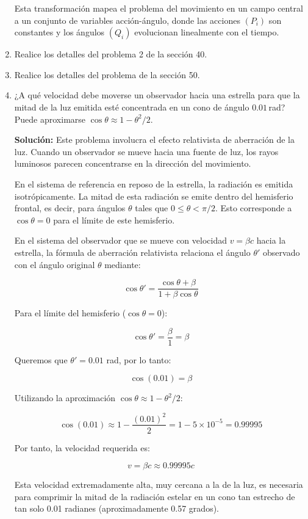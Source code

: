 \documentclass[12pt]{article}
\begin{document}
\begin{enumerate}
  Esta transformación mapea el problema del movimiento en un campo central a un conjunto de variables acción-ángulo, donde las acciones $(P_i)$ son constantes y los ángulos $(Q_i)$ evolucionan linealmente con el tiempo.

  \item Realice los detalles del problema 2 de la sección 40.
  \item Realice los detalles del problema de la sección 50.
  \item ¿A qué velocidad debe moverse un observador hacia una estrella para que la mitad de la luz emitida esté concentrada en un cono de ángulo \(0.01\)\,rad? Puede aproximarse \(\cos\theta\approx1-\theta^2/2\).
  
  \textbf{Solución:} 
  Este problema involucra el efecto relativista de aberración de la luz. Cuando un observador se mueve hacia una fuente de luz, los rayos luminosos parecen concentrarse en la dirección del movimiento.

  En el sistema de referencia en reposo de la estrella, la radiación es emitida isotrópicamente. La mitad de esta radiación se emite dentro del hemisferio frontal, es decir, para ángulos $\theta$ tales que $0 \leq \theta < \pi/2$. Esto corresponde a $\cos\theta = 0$ para el límite de este hemisferio.

  En el sistema del observador que se mueve con velocidad $v = \beta c$ hacia la estrella, la fórmula de aberración relativista relaciona el ángulo $\theta'$ observado con el ángulo original $\theta$ mediante:

  \[
  \cos\theta' = \frac{\cos\theta + \beta}{1 + \beta\cos\theta}
  \]

  Para el límite del hemisferio ($\cos\theta = 0$):

  \[
  \cos\theta' = \frac{\beta}{1} = \beta
  \]

  Queremos que $\theta' = 0.01$ rad, por lo tanto:

  \[
  \cos(0.01) = \beta
  \]

  Utilizando la aproximación $\cos\theta \approx 1-\theta^2/2$:

  \[
  \cos(0.01) \approx 1 - \frac{(0.01)^2}{2} = 1 - 5 \times 10^{-5} = 0.99995
  \]

  Por tanto, la velocidad requerida es:

  \[
  v = \beta c \approx 0.99995c
  \]

  Esta velocidad extremadamente alta, muy cercana a la de la luz, es necesaria para comprimir la mitad de la radiación estelar en un cono tan estrecho de tan solo 0.01 radianes (aproximadamente 0.57 grados).


\end{enumerate}
\end{document}
